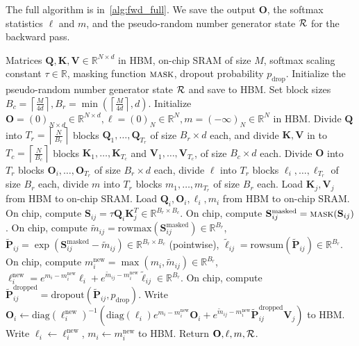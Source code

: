 \documentclass{article}
\newcommand{\diag}{\mathrm{diag}}
\newcommand{\vQ}{\mathbf{Q}}
\newcommand{\vK}{\mathbf{K}}
\newcommand{\vV}{\mathbf{V}}
\newcommand{\vS}{\mathbf{S}}
\newcommand{\vP}{\mathbf{P}}
\newcommand{\vO}{\mathbf{O}}
\newcommand{\sysname}{\textsc{FlashAttention}\xspace}
\begin{document}
The full algorithm is in~\cref{alg:fwd_full}.
We save the output $\vO$, the softmax statistics $\ell$ and $m$, and the pseudo-random
number generator state ${\cal R}$ for the backward pass.
\begin{algorithm}[H]
  \caption{\small\label{alg:fwd_full}\sysname Forward Pass}
  \begin{algorithmic}[1]
    \REQUIRE Matrices $\vQ, \vK, \vV \in \mathbb{R}^{N \times d}$ in HBM, on-chip SRAM of
    size $M$, softmax scaling constant $\tau \in \mathbb{R}$, masking function
    $\textsc{mask}$, dropout probability $p_\mathrm{drop}$.
    \STATE Initialize the pseudo-random number generator state ${\cal R}$ and save to HBM.
    \STATE Set block sizes $B_c = \left\lceil \frac{M}{4d} \right\rceil, B_r = \min \left( \left\lceil \frac{M}{4d} \right\rceil , d \right)$.
    \STATE Initialize $\vO = (0)_{N \times d} \in \mathbb{R}^{N \times d}, \ell = (0)_N \in \mathbb{R}^{N}, m = (-\infty)_N \in \mathbb{R}^{N}$ in HBM.
    \STATE Divide $\vQ$ into $T_r = \left\lceil\frac{N}{B_r} \right\rceil$ blocks $\vQ_1, \dots, \vQ_{T_r}$ of size $B_r \times d$ each,
    and divide $\vK, \vV$ in to $T_c = \left\lceil \frac{N}{B_c} \right\rceil$ blocks $\vK_1, \dots, \vK_{T_c}$ and
    $\vV_1, \dots, \vV_{T_c}$, of size $B_c \times d$ each.
    \STATE Divide $\vO$ into $T_r$ blocks $\vO_i, \dots, \vO_{T_r}$ of size
    $B_r \times d$ each, divide $\ell$ into $T_r$ blocks $\ell_i, \dots, \ell_{T_r}$ of size
    $B_r$ each, divide $m$ into $T_r$ blocks $m_1, \dots, m_{T_r}$ of size $B_r$ each.
      \STATE Load $\vK_j, \vV_j$ from HBM to on-chip SRAM.
        \STATE Load $\vQ_i, \vO_i, \ell_i, m_i$ from HBM to on-chip SRAM.
        \STATE On chip, compute $\vS_{ij} = \tau \vQ_i \vK_j^T \in \mathbb{R}^{B_r \times B_c}$.
        \STATE On chip, compute $\vS_{ij}^{\mathrm{masked}} = \textsc{mask}(\vS_{ij})$.
        \STATE On chip, compute $\tilde{m}_{ij} = \mathrm{rowmax}(\vS_{ij}^{\mathrm{masked}}) \in \mathbb{R}^{B_r}$, $\tilde{\vP}_{ij} = \exp(\vS_{ij}^{\mathrm{masked}} - \tilde{m}_{ij}) \in \mathbb{R}^{B_r \times B_c}$ (pointwise),
        $\tilde{\ell}_{ij} = \mathrm{row sum}(\tilde{\vP}_{ij}) \in \mathbb{R}^{B_r}$.
        \STATE On chip, compute $m_i^{\mathrm{new}} = \max(m_i, \tilde{m}_{ij}) \in \mathbb{R}^{B_r}$, $\ell_i^{\mathrm{new}} = e^{m_i - m_i^{\mathrm{new}}} \ell_i + e^{\tilde{m}_{ij} - m_i^{\mathrm{new}}} \tilde{\ell}_{ij} \in \mathbb{R}^{B_r}$.
        \STATE On chip, compute $\tilde{\vP}_{ij}^{\mathrm{dropped}} = \mathrm{dropout}(\tilde{\vP}_{ij}, p_\mathrm{drop})$.
        \STATE Write $\vO_i \leftarrow \diag(\ell_i^{\mathrm{new}})^{-1}(\diag(\ell_i) e^{m_i - m_i^{\mathrm{new}}} \vO_i + e^{\tilde{m}_{ij} - m_i^{\mathrm{new}}}\tilde{\vP}_{ij}^{\mathrm{dropped}} \vV_j)$
        to HBM.
        \STATE Write $\ell_i \leftarrow \ell_i^{\mathrm{new}}$, $m_i \leftarrow m_i^{\mathrm{new}}$ to HBM.
      \ENDFOR
    \ENDFOR
    \STATE Return $\vO, \ell, m, {\cal R}$.
  \end{algorithmic}
\end{algorithm}
\end{document}
